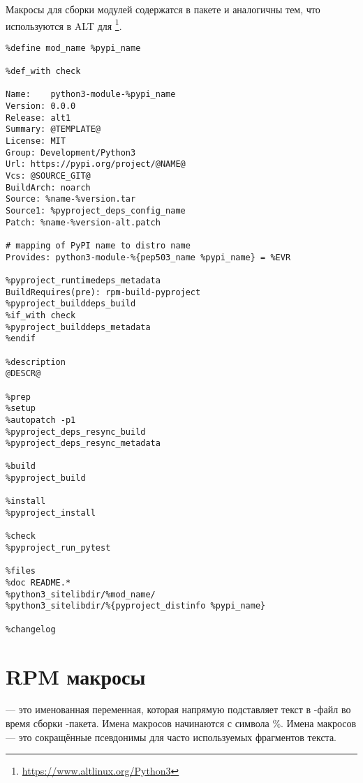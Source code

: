 	Макросы для сборки модулей  содержатся в пакете  и
	аналогичны тем, что используются в ALT для \footnote{\href{https://www.altlinux.org/Python3}{https://www.altlinux.org/Python3}}.
\begin{Verbatim}[breaklines=true,breakanywhere=true,fontsize=\scriptsize]
%define pypi_name @NAME@
%define mod_name %pypi_name
		
%def_with check
		
Name:    python3-module-%pypi_name
Version: 0.0.0
Release: alt1
Summary: @TEMPLATE@
License: MIT
Group: Development/Python3
Url: https://pypi.org/project/@NAME@
Vcs: @SOURCE_GIT@
BuildArch: noarch
Source: %name-%version.tar
Source1: %pyproject_deps_config_name
Patch: %name-%version-alt.patch
		
# mapping of PyPI name to distro name
Provides: python3-module-%{pep503_name %pypi_name} = %EVR
		
%pyproject_runtimedeps_metadata
BuildRequires(pre): rpm-build-pyproject
%pyproject_builddeps_build
%if_with check
%pyproject_builddeps_metadata
%endif
		
%description
@DESCR@
	
%prep
%setup
%autopatch -p1
%pyproject_deps_resync_build
%pyproject_deps_resync_metadata
		
%build
%pyproject_build
		
%install
%pyproject_install
		
%check
%pyproject_run_pytest
		
%files
%doc README.*
%python3_sitelibdir/%mod_name/
%python3_sitelibdir/%{pyproject_distinfo %pypi_name}
		
%changelog
\end{Verbatim}

\section{RPM макросы}
 --- это именованная переменная, которая напрямую подставляет текст в -файл
во время сборки -пакета. Имена макросов начинаются с символа \%. Имена макросов --- это
сокращённые псевдонимы для часто используемых фрагментов текста.
	
